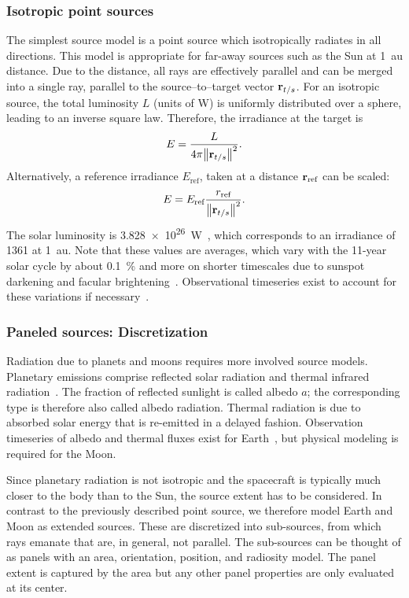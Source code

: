 \subsubsection{Isotropic point sources}
The simplest source model is a point source which isotropically radiates in all directions. This model is appropriate for far-away sources such as the Sun at \qty{1}{\astronomicalunit} distance. Due to the distance, all rays are effectively parallel and can be merged into a single ray, parallel to the source--to--target vector $\vb r_{t/s}$. For an isotropic source, the total luminosity $L$ (units of \unit{\W}) is uniformly distributed over a sphere, leading to an inverse square law. Therefore, the irradiance at the target is
\begin{align}
    \label{eq:irradiance-point-luminosity}
    E = \frac{L}{4\pi\norm{\vb r_{t/s}}^2}.
\end{align}
Alternatively, a reference irradiance $E_\text{ref}$, taken at a distance $\vb r_\text{ref}$ can be scaled:
\begin{align}
    E = E_\text{ref} \frac{r_\text{ref}}{\norm{\vb r_{t/s}}^2}.
\end{align}
The solar luminosity is \qty{3.828e26}{\W}~\cite{Prsa2016}, which corresponds to an irradiance of \qty{1361}{\irr} at \qty{1}{\astronomicalunit}. Note that these values are averages, which vary with the 11-year solar cycle by about \qty{0.1}{\percent} and more on shorter timescales due to sunspot darkening and facular brightening~\cite{Kopp2016}. Observational timeseries exist to account for these variations if necessary~\cite{Dewitte2017}.

\subsubsection{Paneled sources: Discretization}
Radiation due to planets and moons requires more involved source models. Planetary emissions comprise reflected solar radiation and thermal infrared radiation~\cite{Knocke1988}. The fraction of reflected sunlight is called albedo $a$; the corresponding type is therefore also called albedo radiation. Thermal radiation is due to absorbed solar energy that is re-emitted in a delayed fashion. Observation timeseries of albedo and thermal fluxes exist for Earth~\cite{Dewitte2017}, but physical modeling is required for the Moon.

Since planetary radiation is not isotropic and the spacecraft is typically much closer to the body than to the Sun, the source extent has to be considered. In contrast to the previously described point source, we therefore model Earth and Moon as extended sources. These are discretized into sub-sources, from which rays emanate that are, in general, not parallel. The sub-sources can be thought of as panels with an area, orientation, position, and radiosity model. The panel extent is captured by the area but any other panel properties are only evaluated at its center.

